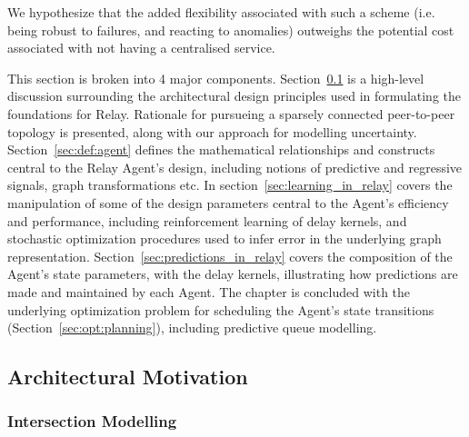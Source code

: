 \documentclass{report}
\begin{document}
We hypothesize that the added flexibility associated with such a scheme (i.e. being robust to failures, and reacting to anomalies) outweighs the potential cost associated with not having a centralised service.

This section is broken into 4 major components.
Section~\ref{sec:deep:motivation} is a high-level discussion surrounding the architectural design principles used in formulating the foundations for Relay.
Rationale for pursueing a sparsely connected peer-to-peer topology is presented, along with our approach for modelling uncertainty.
Section~\ref{sec:def:agent} defines the mathematical relationships and constructs central to the Relay Agent's design, including notions of predictive and regressive signals, graph transformations etc.
In section~\ref{sec:learning_in_relay} covers the manipulation of some of the design parameters central to the Agent's efficiency and performance, including reinforcement learning of delay kernels, and stochastic optimization procedures used to infer error in the underlying graph representation.
Section~\ref{sec:predictions_in_relay} covers the composition of the Agent's state parameters, with the delay kernels, illustrating how predictions are made and maintained by each Agent.
The chapter is concluded with the underlying optimization problem for scheduling the Agent's state transitions (Section~\ref{sec:opt:planning}), including predictive queue modelling.


\subsection{Architectural Motivation}
\label{sec:deep:motivation}

\subsubsection{Intersection Modelling}
\label{subsubsec:intersection_modelling}
\end{document}
